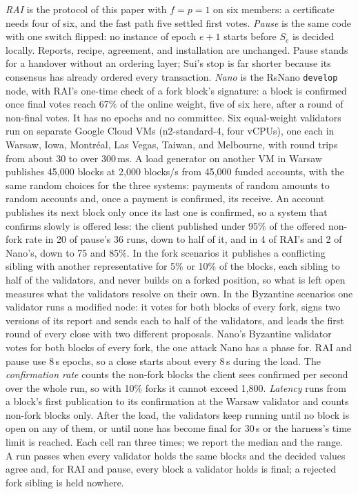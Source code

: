 \emph{RAI} is the protocol of this paper with $f=p=1$ on six members: a certificate needs four of six, and the fast path five settled first votes. \emph{Pause} is the same code with one switch flipped: no instance of epoch $e+1$ starts before $S_e$ is decided locally. Reports, recipe, agreement, and installation are unchanged. Pause stands for a handover without an ordering layer; Sui's stop is far shorter because its consensus has already ordered every transaction. \emph{Nano} is the RsNano \texttt{develop} node, with RAI's one-time check of a fork block's signature: a block is confirmed once final votes reach 67\% of the online weight, five of six here, after a round of non-final votes. It has no epochs and no committee.
Six equal-weight validators run on separate Google Cloud VMs (n2-standard-4, four vCPUs), one each in Warsaw, Iowa, Montr\'eal, Las Vegas, Taiwan, and Melbourne, with round trips from about 30 to over 300\,ms. A load generator on another VM in Warsaw publishes 45{,}000 blocks at 2{,}000 blocks/s from 45{,}000 funded accounts, with the same random choices for the three systems: payments of random amounts to random accounts and, once a payment is confirmed, its receive. An account publishes its next block only once its last one is confirmed, so a system that confirms slowly is offered less: the client published under 95\% of the offered non-fork rate in 20 of pause's 36 runs, down to half of it, and in 4 of RAI's and 2 of Nano's, down to 75 and 85\%. In the fork scenarios it publishes a conflicting sibling with another representative for 5\% or 10\% of the blocks, each sibling to half of the validators, and never builds on a forked position, so what is left open measures what the validators resolve on their own. In the Byzantine scenarios one validator runs a modified node: it votes for both blocks of every fork, signs two versions of its report and sends each to half of the validators, and leads the first round of every close with two different proposals. Nano's Byzantine validator votes for both blocks of every fork, the one attack Nano has a phase for. RAI and pause use 8\,s epochs, so a close starts about every 8\,s during the load. The \emph{confirmation rate} counts the non-fork blocks the client sees confirmed per second over the whole run, so with 10\% forks it cannot exceed 1{,}800. \emph{Latency} runs from a block's first publication to its confirmation at the Warsaw validator and counts non-fork blocks only. After the load, the validators keep running until no block is open on any of them, or until none has become final for 30\,s or the harness's time limit is reached. Each cell ran three times; we report the median and the range. A run passes when every validator holds the same blocks and the decided values agree and, for RAI and pause, every block a validator holds is final; a rejected fork sibling is held nowhere.


